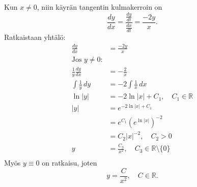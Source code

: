 \documentclass{article}
\begin{document}
Kun $x \neq 0$, niin käyrän tangentin kulmakerroin on
\[
  \frac{dy}{dx} = \frac{\frac{dy}{dt}}{\frac{dx}{dt}} = \frac{-2y}{x}.
\]
Ratkaistaan yhtälö:
\begin{align*}
  \frac{dy}{dx} &= \frac{-2y}{x} \\
  \text{Jos $y \neq 0$:} \\
  \frac{1}{y}\frac{dy}{dx} &= -\frac{2}{x} \\
  \int \frac{1}{y}\,dy &= -2\int \frac{1}{x}\,dx \\
  \ln |y| &= -2\ln |x| + C_1, \quad C_1 \in \mathbb{R} \\
  |y| &= e^{-2\ln |x| + C_1} \\
      &= e^{C_1}(e^{\ln |x|})^{-2} \\
      &= C_2|x|^{-2}, \quad C_2 > 0 \\
  y &= \frac{C_3}{x^2}, \quad C_3 \in \mathbb{R} \setminus \{0\} \\
\end{align*}
Myös $y \equiv 0$ on ratkaisu, joten
\[
  y = \frac{C}{x^2}, \quad C \in \mathbb{R}.
\]
\end{document}
